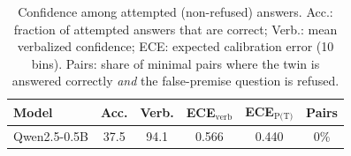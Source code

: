 \begin{table}[t]
\centering
\caption{Confidence among attempted (non-refused) answers. Acc.: fraction of attempted answers that are correct; Verb.: mean verbalized confidence; ECE: expected calibration error (10 bins). Pairs: share of minimal pairs where the twin is answered correctly \emph{and} the false-premise question is refused.}
\label{tab:calibration}
\setlength{\tabcolsep}{2.5pt}
\footnotesize
\begin{tabular}{lccccc}
\toprule
Model & Acc. & Verb. & ECE$_{\text{verb}}$ & ECE$_{\text{P(T)}}$ & Pairs \\
\midrule
Qwen2.5-0.5B & 37.5 & 94.1 & 0.566 & 0.440 & 0\% \\
\bottomrule
\end{tabular}
\end{table}
